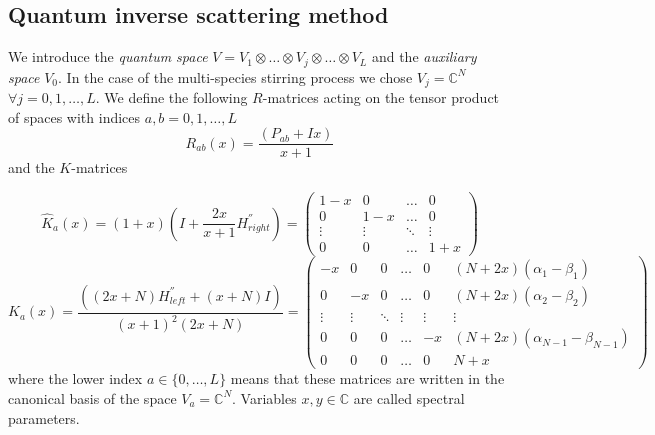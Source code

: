 \documentclass[10pt]{article}
\numberwithin{equation}{section}
\numberwithin{equation}{subsection}
\begin{document}
\subsection{Quantum inverse scattering method}\label{SubsectionQISM}
We introduce the \textit{quantum space} $V=V_{1}\otimes\ldots\otimes V_{j}\otimes\ldots\otimes V_{L}$ and the \textit{auxiliary space} $V_{0}$. In the case of the multi-species stirring process we chose $V_{j}=\mathbb{C}^{N}$ $\forall j=0,1,\ldots ,L$. We define the following $R$-matrices acting on the tensor product of spaces with indices $a,b=0,1,\ldots,L$
\begin{equation}\label{Rmatrix}
	R_{ab}(x)=\frac{(P_{ab}+Ix)}{x+1}
\end{equation}
and the $K$-matrices

\begin{equation}\label{KmatrixHAT}
	\widehat{K}_{a}(x)=(1+x)\left(I+\frac{2x}{x+1}H^{''}_{right}\right)=\begin{pmatrix}
		1-x&0&\ldots&0\\
		0&1-x&\ldots&0\\
		\vdots&\vdots&\ddots&\vdots\\
		0&0&\ldots&1+x
	\end{pmatrix}
\end{equation}
\begin{equation}\label{Kmatrix}
	K_{a}(x)=\frac{\left((2x+N)H^{''}_{left}+(x+N)I\right)}{(x+1)^{2}(2x+N)}=\begin{pmatrix}
		-x&0&0&\ldots&0&(N+2x)(\alpha_{1}-\beta_{1})\\
		0&-x&0&\ldots&0&(N+2x)(\alpha_{2}-\beta_{2})\\
		\vdots&\vdots&\ddots&\vdots&\vdots&\vdots\\
		0&0&0&\ldots&-x&(N+2x)(\alpha_{N-1}-\beta_{N-1})\\
		0&0&0&\ldots&0&N+x
	\end{pmatrix}
\end{equation}
where the lower index $a\in\{0,\ldots,L\}$ means that these matrices are written in the canonical basis of the space $V_{a}=\mathbb{C}^{N}$. Variables $x,y\in\mathbb{C}$ are called spectral parameters.  
\end{document}
